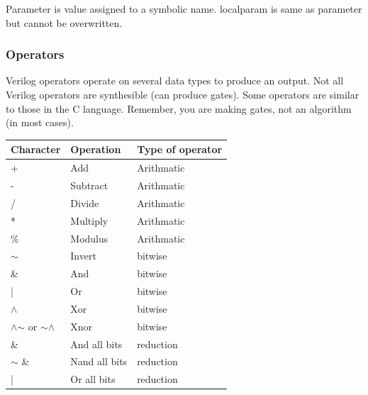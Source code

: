 Parameter is value assigned to a symbolic name.
localparam is same as parameter but cannot be overwritten.


\clearpage
\subsubsection{Operators}
Verilog operators operate on several data types to produce an output. Not all Verilog operators are synthesible (can produce gates). Some operators are similar to those in the C language. Remember, you are making gates, not an algorithm (in most cases).

\begin{table}[H]
\begin{center}
\begin{tabular}{@{}lll@{}}
\toprule
\textbf{Character}                 & \textbf{Operation}             & \textbf{Type of operator}  \\ \midrule
+                                  & Add                            & Arithmatic   \\
-                                  & Subtract                       & Arithmatic   \\
/                                  & Divide                         & Arithmatic   \\
*                                  & Multiply                       & Arithmatic   \\
\%                                 & Modulus                        & Arithmatic   \\
$\sim$                             & Invert                         & bitwise      \\
\&                                 & And                            & bitwise      \\
|                                  & Or                             & bitwise      \\
$\wedge$                           & Xor                            & bitwise      \\
$\wedge$$\sim$  or $\sim$$\wedge$  & Xnor                           & bitwise      \\
\&	                               & And all bits                   & reduction    \\
$\sim$ \&	                       & Nand all bits                  & reduction    \\
|                                  & Or all bits                    & reduction    \\

\end{tabular}
\end{center}
\end{table}
